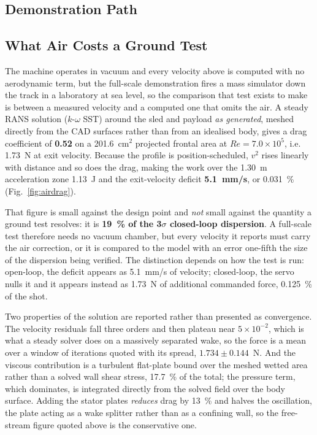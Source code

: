 \documentclass[conference]{IEEEtran}
\begin{document}
\subsection{Demonstration Path}
\subsection{What Air Costs a Ground Test}\label{sec:airdrag}
The machine operates in vacuum and every velocity above is computed with no aerodynamic term, but the full-scale demonstration fires a mass simulator down the track in a laboratory at sea level, so the comparison that test exists to make is between a measured velocity and a computed one that omits the air. A steady RANS solution ($k$-$\omega$ SST) around the sled and payload \emph{as generated}, meshed directly from the CAD surfaces rather than from an idealised body, gives a drag coefficient of \textbf{0.52} on a 201.6~cm$^2$ projected frontal area at $Re = 7.0\times10^5$, i.e. 1.73~N at exit velocity. Because the profile is position-scheduled, $v^2$ rises linearly with distance and so does the drag, making the work over the 1.30~m acceleration zone 1.13~J and the exit-velocity deficit \textbf{5.1~mm/s}, or 0.031~\% (Fig.~\ref{fig:airdrag}).

That figure is small against the design point and \emph{not} small against the quantity a ground test resolves: it is \textbf{19~\% of the 3$\sigma$ closed-loop dispersion}. A full-scale test therefore needs no vacuum chamber, but every velocity it reports must carry the air correction, or it is compared to the model with an error one-fifth the size of the dispersion being verified. The distinction depends on how the test is run: open-loop, the deficit appears as 5.1~mm/s of velocity; closed-loop, the servo nulls it and it appears instead as 1.73~N of additional commanded force, 0.125~\% of the shot.

Two properties of the solution are reported rather than presented as convergence. The velocity residuals fall three orders and then plateau near $5\times10^{-2}$, which is what a steady solver does on a massively separated wake, so the force is a mean over a window of iterations quoted with its spread, $1.734 \pm 0.144$~N. And the viscous contribution is a turbulent flat-plate bound over the meshed wetted area rather than a solved wall shear stress, 17.7~\% of the total; the pressure term, which dominates, is integrated directly from the solved field over the body surface. Adding the stator plates \emph{reduces} drag by 13~\% and halves the oscillation, the plate acting as a wake splitter rather than as a confining wall, so the free-stream figure quoted above is the conservative one.
\end{document}
